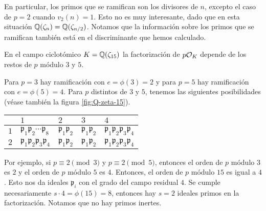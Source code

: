 En particular, los primos que se ramifican son los divisores de $n$, excepto
el caso de $p = 2$ cuando ${v_2 (n) = 1}$. Esto no es muy interesante, dado que
en esta situación $\mathbb{Q} (\zeta_n) = \mathbb{Q} (\zeta_{n/2})$. Notamos que
la información sobre los primos que se ramifican también está en
el discriminante que hemos calculado.

\begin{ejemplo}
  En el campo ciclotómico $K = \mathbb{Q} (\zeta_{15})$ la factorización de $p \mathcal{O}_K$
  depende de los restos de $p$ módulo $3$ y $5$.

  Para $p = 3$ hay ramificación con $e = \phi (3) = 2$ y para $p = 5$ hay
  ramificación con $e = \phi (5) = 4$. Para $p$ distintos de $3$ y $5$, tenemos
  las siguientes posibilidades (véase también la figura \ref{fig:Q-zeta-15}).

  \begin{center}
    \renewcommand{\arraystretch}{2}
    \begin{tabular}{|c|x{2.5cm}|x{2.5cm}|x{2.5cm}|x{2.5cm}|}
      \hline
       & $1$ & $2$ & $3$ & $4$ \tabularnewline
      \hline
      $1$ & $\mathfrak{p}_1 \mathfrak{p}_2\cdots \mathfrak{p}_8$ & $\mathfrak{p}_1 \mathfrak{p}_2$ & $\mathfrak{p}_1 \mathfrak{p}_2$ & $\mathfrak{p}_1 \mathfrak{p}_2 \mathfrak{p}_3 \mathfrak{p}_4$ \tabularnewline
      \hline
      $2$ & $\mathfrak{p}_1 \mathfrak{p}_2 \mathfrak{p}_3 \mathfrak{p}_4$ & $\mathfrak{p}_1 \mathfrak{p}_2$ & $\mathfrak{p}_1 \mathfrak{p}_2$ & $\mathfrak{p}_1 \mathfrak{p}_2 \mathfrak{p}_3 \mathfrak{p}_4$ \tabularnewline
      \hline
    \end{tabular}
  \end{center}

  Por ejemplo, si $p \equiv 2 \pmod{3}$ y $p \equiv 2 \pmod{5}$, entonces
  el orden de $p$ módulo $3$ es $2$ y el orden de $p$ módulo $5$ es $4$.
  Entonces, el orden de $p$ módulo $15$ es igual a $4$. Esto nos da ideales
  $\mathfrak{p}_i$ con el grado del campo residual $4$. Se cumple necesariamente
  $s\cdot 4 = \phi (15) = 8$, entonces hay $s = 2$ ideales primos en
  la factorización. Notamos que no hay primos inertes.
\end{ejemplo}

